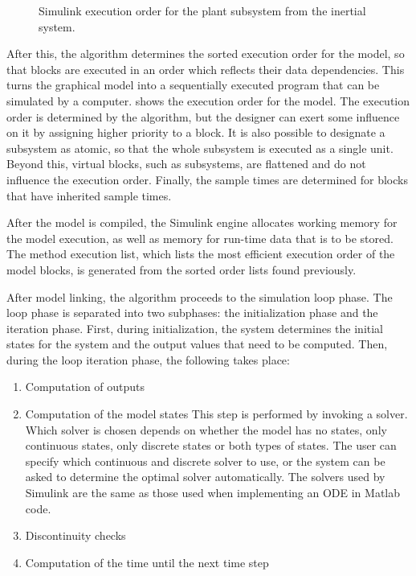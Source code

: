 \documentclass[\rootfolder/main.tex]{subfiles}
\begin{document}
\begin{figure}[ht]
    \caption{Simulink execution order for the plant subsystem from the inertial system.\label{fig:simulink-inertial-order}}
\end{figure}

After this, the algorithm determines the sorted execution order for the model, so that blocks are executed in an order which reflects their data dependencies.
This turns the graphical model into a sequentially executed program that can be simulated by a computer.
 shows the execution order for the model.
The execution order is determined by the algorithm, but the designer can exert some influence on it by assigning higher priority to a block.
It is also possible to designate a subsystem as atomic, so that the whole subsystem is executed as a single unit.
Beyond this, virtual blocks, such as subsystems, are flattened and do not influence the execution order.
Finally, the sample times are determined for blocks that have inherited sample times.

After the model is compiled, the Simulink engine allocates working memory for the model execution, as well as memory for run-time data that is to be stored.
The method execution list, which lists the most efficient execution order of the model blocks, is generated from the sorted order lists found previously.

After model linking, the algorithm proceeds to the simulation loop phase.
The loop phase is separated into two subphases: the initialization phase and the iteration phase.
First, during initialization, the system determines the initial states for the system and the output values that need to be computed.
Then, during the loop iteration phase, the following takes place:

\begin{enumerate}
    \item Computation of outputs
    \item Computation of the model states
        This step is performed by invoking a solver.
        Which solver is chosen depends on whether the model has no states, only continuous states, only discrete states or both types of states.
        The user can specify which continuous and discrete solver to use, or the system can be asked to determine the optimal solver automatically.
        The solvers used by Simulink are the same as those used when implementing an ODE in Matlab code.
    \item Discontinuity checks
    \item Computation of the time until the next time step
\end{enumerate}
\end{document}
